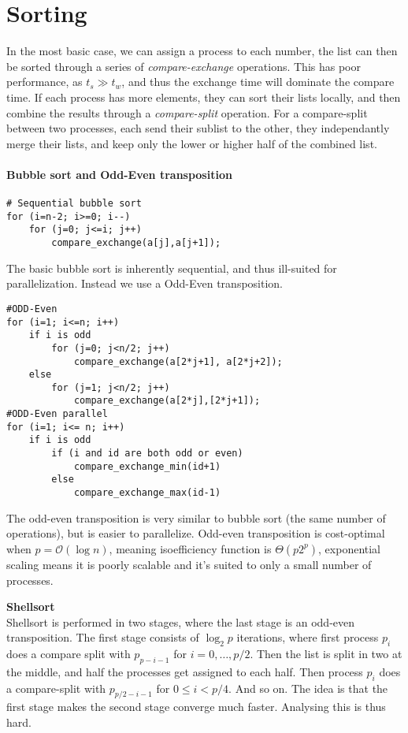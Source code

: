 \documentclass[a4paper,10pt,twoside,twocolumn]{article}
\renewcommand{\(}{\left(}
\renewcommand{\)}{\right)}
\begin{document}
\clearpage

\section*{Sorting}

In the most basic case, we can assign a process to each number, the list can then be sorted through a series of \emph{compare-exchange} operations. This has poor performance, as $t_s \gg t_w$, and thus the exchange time will dominate the compare time. If each process has more elements, they can sort their lists locally, and then combine the results through a \emph{compare-split} operation. For a compare-split between two processes, each send their sublist to the other, they independantly merge their lists, and keep only the lower or higher half of the combined list.

\paragraph{Bubble sort and Odd-Even transposition}

\begin{verbatim}
# Sequential bubble sort
for (i=n-2; i>=0; i--)
    for (j=0; j<=i; j++)
        compare_exchange(a[j],a[j+1]);    
\end{verbatim}
The basic bubble sort is inherently sequential, and thus ill-suited for parallelization. Instead we use a Odd-Even transposition.
\begin{verbatim}
#ODD-Even
for (i=1; i<=n; i++)
    if i is odd
        for (j=0; j<n/2; j++) 
            compare_exchange(a[2*j+1], a[2*j+2]);
    else
        for (j=1; j<n/2; j++)
            compare_exchange(a[2*j],[2*j+1]);
#ODD-Even parallel
for (i=1; i<= n; i++)
    if i is odd
        if (i and id are both odd or even)
            compare_exchange_min(id+1)
        else
            compare_exchange_max(id-1)
\end{verbatim}
The odd-even transposition is very similar to bubble sort (the same number of operations), but is easier to parallelize. Odd-even transposition is cost-optimal when $p=\mathcal{O}(\log n)$, meaning isoefficiency function is $\Theta(p2^p)$, exponential scaling means it is poorly scalable and it's suited to only a small number of processes.

\textbf{Shellsort} \\
Shellsort is performed in two stages, where the last stage is an odd-even transposition. The first stage consists of $\log_2 p$ iterations, where first process $p_i$ does a compare split with $p_{p-i-1}$ for $i=0,\ldots, p/2$. Then the list is split in two at the middle, and half the processes get assigned to each half. Then process $p_i$ does a compare-split with $p_{p/2-i-1}$ for $0\leq i < p/4$. And so on. The idea is that the first stage makes the second stage converge much faster. Analysing this is thus hard.
\end{document}
